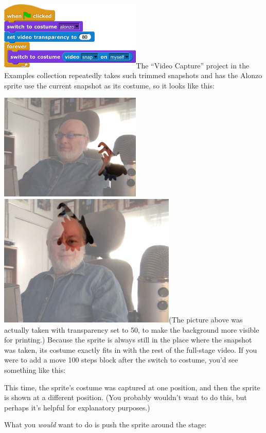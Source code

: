 \includegraphics[width=2.67014in,height=1.29861in]{media/image816.png}The
``Video Capture'' project in the Examples collection repeatedly takes
such trimmed snapshots and has the Alonzo sprite use the current
snapshot as its costume, so it looks like this:

\includegraphics[width=2.66667in,height=2in]{media/image817.png}\includegraphics[width=3.33333in,height=2.5in]{media/image818.png}(The
picture above was actually taken with transparency set to 50, to make
the background more visible for printing.) Because the sprite is always
still in the place where the snapshot was taken, its costume exactly
fits in with the rest of the full-stage video. If you were to add a move
100 steps block after the switch to costume, you'd see something like
this:

This time, the sprite's costume was captured at one position, and then
the sprite is shown at a different position. (You probably wouldn't want
to do this, but perhaps it's helpful for explanatory purposes.)

What you \emph{would} want to do is push the sprite around the stage:

